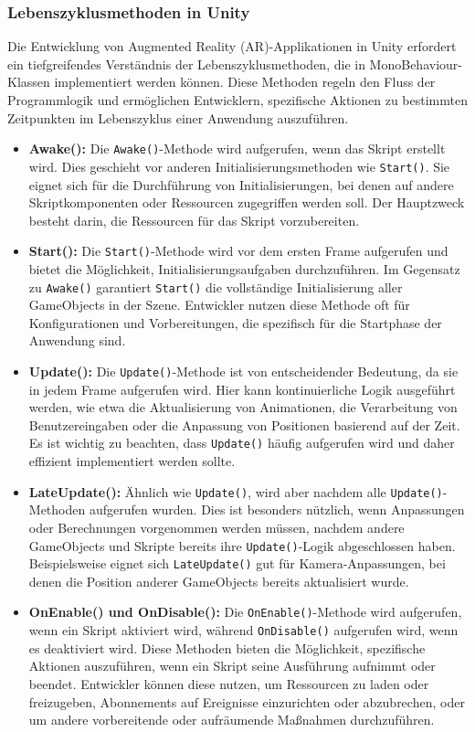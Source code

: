 \subsubsection{\label{sec:Shrek is leben}Lebenszyklusmethoden in Unity}
Die Entwicklung von Augmented Reality (AR)-Applikationen in Unity erfordert ein tiefgreifendes Verständnis der
Lebenszyklusmethoden, die in MonoBehaviour-Klassen implementiert werden können. Diese Methoden regeln den Fluss der
Programmlogik und ermöglichen Entwicklern, spezifische Aktionen zu bestimmten Zeitpunkten im Lebenszyklus einer
Anwendung auszuführen.

\begin{itemize}
    \item \textbf{Awake():} Die \texttt{Awake()}-Methode wird aufgerufen, wenn das Skript erstellt wird. Dies geschieht
    vor anderen Initialisierungsmethoden wie \texttt{Start()}. Sie eignet sich für die Durchführung von
    Initialisierungen, bei denen auf andere Skriptkomponenten oder Ressourcen zugegriffen werden soll. Der Hauptzweck
    besteht darin, die Ressourcen für das Skript vorzubereiten.
    \item \textbf{Start():} Die \texttt{Start()}-Methode wird vor dem ersten Frame aufgerufen und bietet die
    Möglichkeit, Initialisierungsaufgaben durchzuführen. Im Gegensatz zu \texttt{Awake()} garantiert \texttt{Start()}
    die vollständige Initialisierung aller GameObjects in der Szene. Entwickler nutzen diese Methode oft für
    Konfigurationen und Vorbereitungen, die spezifisch für die Startphase der Anwendung sind.
    \item \textbf{Update():} Die \texttt{Update()}-Methode ist von entscheidender Bedeutung, da sie in jedem Frame
    aufgerufen wird. Hier kann kontinuierliche Logik ausgeführt werden, wie etwa die Aktualisierung von Animationen,
    die Verarbeitung von Benutzereingaben oder die Anpassung von Positionen basierend auf der Zeit. Es ist wichtig zu
    beachten, dass \texttt{Update()} häufig aufgerufen wird und daher effizient implementiert werden sollte.
    \item \textbf{LateUpdate():} Ähnlich wie \texttt{Update()}, wird aber nachdem alle \texttt{Update()}-Methoden
    aufgerufen wurden. Dies ist besonders nützlich, wenn Anpassungen oder Berechnungen vorgenommen werden müssen,
    nachdem andere GameObjects und Skripte bereits ihre \texttt{Update()}-Logik abgeschlossen haben. Beispielsweise
    eignet sich \texttt{LateUpdate()} gut für Kamera-Anpassungen, bei denen die Position anderer GameObjects bereits
    aktualisiert wurde.
    \item \textbf{OnEnable() und OnDisable():} Die \texttt{OnEnable()}-Methode wird aufgerufen, wenn ein Skript
    aktiviert wird, während \texttt{OnDisable()} aufgerufen wird, wenn es deaktiviert wird. Diese Methoden bieten
    die Möglichkeit, spezifische Aktionen auszuführen, wenn ein Skript seine Ausführung aufnimmt oder beendet.
    Entwickler können diese nutzen, um Ressourcen zu laden oder freizugeben, Abonnements auf Ereignisse
    einzurichten oder abzubrechen, oder um andere vorbereitende oder aufräumende Maßnahmen durchzuführen.
\end{itemize}

